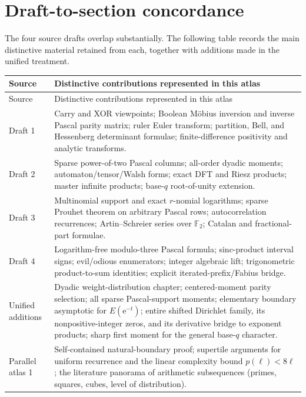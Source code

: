 \documentclass[11pt,oneside]{article}
\numberwithin{equation}{section}
\theoremstyle{definition}
\theoremstyle{remark}
\newcommand{\e}{\mathrm e}
\begin{document}
\section[Draft concordance]{Draft-to-section concordance}
\label{p1:app:draft-concordance}

The four source drafts overlap substantially.  The following table records
the main distinctive material retained from each, together with additions made
in the unified treatment.

\renewcommand{\arraystretch}{1.16}
\begin{longtable}{@{}p{}p{}@{}}
\toprule
Source & Distinctive contributions represented in this atlas \\
\midrule
\endfirsthead
\toprule
Source & Distinctive contributions represented in this atlas \\
\midrule
\endhead
Draft 1 & Carry and XOR viewpoints; Boolean M\"obius inversion and inverse Pascal parity matrix; ruler Euler transform; partition, Bell, and Hessenberg determinant formulae; finite-difference positivity and analytic transforms. \\
Draft 2 & Sparse power-of-two Pascal columns; all-order dyadic moments; automaton/tensor/Walsh forms; exact DFT and Riesz products; master infinite products; base-\(q\) root-of-unity extension. \\
Draft 3 & Multinomial support and exact \(r\)-nomial logarithms; sparse Prouhet theorem on arbitrary Pascal rows; autocorrelation recurrences; Artin--Schreier series over \(\mathbb F_2\); Catalan and fractional-part formulae. \\
Draft 4 & Logarithm-free modulo-three Pascal formula; sinc-product interval signs; evil/odious enumerators; integer algebraic lift; trigonometric product-to-sum identities; explicit iterated-prefix/Fabius bridge. \\
Unified additions & Dyadic weight-distribution chapter; centered-moment parity selection; all sparse Pascal-support moments; elementary boundary asymptotic for \(E(\e^{-t})\); entire shifted Dirichlet family, its nonpositive-integer zeros, and its derivative bridge to exponent products; sharp first moment for the general base-\(q\) character. \\
\midrule
Parallel atlas 1 & Self-contained natural-boundary proof; supertile arguments for uniform recurrence and the linear complexity bound \(p(\ell)<8\ell\); the literature panorama of arithmetic subsequences (primes, squares, cubes, level of distribution). \\

\end{longtable}
\end{document}
